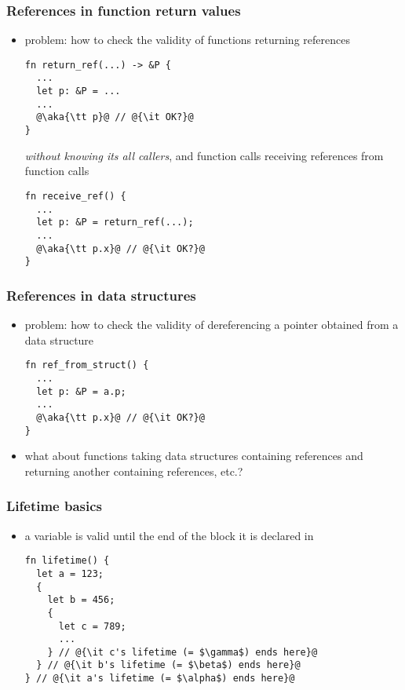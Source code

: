 \documentclass[12pt,dvipdfmx]{beamer}
\newcommand{\aka}[1]{{\color{red}#1}}
\begin{document}
\begin{frame}[fragile]
  \frametitle{References in function return values}
  \begin{itemize}
  \item problem: how to check the validity of functions returning references
\begin{lstlisting}
fn return_ref(...) -> &P {
  ...
  let p: &P = ...
  ...
  @\aka{\tt p}@ // @{\it OK?}@
}
\end{lstlisting}
{\it without knowing its all callers}, and function calls receiving references
from function calls
\begin{lstlisting}
fn receive_ref() {
  ...
  let p: &P = return_ref(...);
  ...
  @\aka{\tt p.x}@ // @{\it OK?}@
}
\end{lstlisting}
\end{itemize}
\end{frame}

\begin{frame}[fragile]
  \frametitle{References in data structures}
  \begin{itemize}
  \item problem:
    how to check the validity of dereferencing a pointer obtained from a data structure
\begin{lstlisting}
fn ref_from_struct() {
  ...
  let p: &P = a.p;
  ...
  @\aka{\tt p.x}@ // @{\it OK?}@
}
\end{lstlisting}

\item what about functions taking data structures containing references
  and returning another containing references, etc.?

  \end{itemize}
\end{frame}

\iffalse
\begin{frame}[fragile]
  \frametitle{Lifetime basics}
  \begin{itemize}
  \item a variable is valid until the end of the block it is declared in
\begin{lstlisting}
fn lifetime() {
  let a = 123;
  {
    let b = 456;
    {
      let c = 789;
      ...
    } // @{\it c's lifetime (= $\gamma$) ends here}@
  } // @{\it b's lifetime (= $\beta$) ends here}@
} // @{\it a's lifetime (= $\alpha$) ends here}@
\end{lstlisting}
\end{itemize}
\end{frame}
\end{document}
